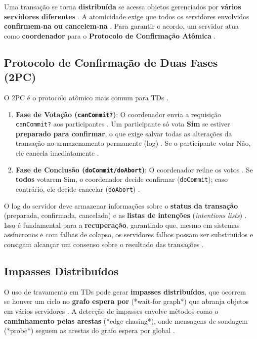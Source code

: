 \documentclass[12pt, a4paper]{article}
\begin{document}
Uma transação se torna \textbf{distribuída} se acessa objetos gerenciados por \textbf{vários servidores diferentes} \cite{616, 728}. A atomicidade exige que todos os servidores envolvidos \textbf{confirmem-na ou cancelem-na} \cite{616, 615}. Para garantir o acordo, um servidor atua como \textbf{coordenador} para o \textbf{Protocolo de Confirmação Atômica} \cite{731, 413}.

\subsection{Protocolo de Confirmação de Duas Fases (2PC)}

O 2PC é o protocolo atômico mais comum para TDs \cite{615, 731, 620}.

\begin{enumerate}
    \item \textbf{Fase de Votação (\texttt{canCommit?})}: O coordenador envia a requisição \texttt{canCommit?} aos participantes \cite{731}. Um participante só vota \textbf{Sim} se estiver \textbf{preparado para confirmar}, o que exige salvar todas as alterações da transação no armazenamento permanente (log) \cite{617, 732}. Se o participante votar Não, ele cancela imediatamente \cite{731, 620}.
    \item \textbf{Fase de Conclusão (\texttt{doCommit/doAbort})}: O coordenador reúne os votos \cite{620}. Se \textbf{todos} votarem Sim, o coordenador decide confirmar (\texttt{doCommit}); caso contrário, ele decide cancelar (\texttt{doAbort}) \cite{731}.
\end{enumerate}

O log do servidor deve armazenar informações sobre o \textbf{status da transação} (preparada, confirmada, cancelada) e as \textbf{listas de intenções} (\textit{intentions lists}) \cite{419}. Isso é fundamental para a \textbf{recuperação}, garantindo que, mesmo em sistemas assíncronos e com falhas de colapso, os servidores falhos possam ser substituídos e consigam alcançar um consenso sobre o resultado das transações \cite{431, 620}.

\subsection{Impasses Distribuídos}

O uso de travamento em TDs pode gerar \textbf{impasses distribuídos}, que ocorrem se houver um ciclo no \textbf{grafo espera por} (*wait-for graph*) que abranja objetos em vários servidores \cite{410, 743}. A detecção de impasses envolve métodos como o \textbf{caminhamento pelas arestas} (*edge chasing*), onde mensagens de sondagem (*probe*) seguem as arestas do grafo espera por global \cite{415}.
\end{document}
